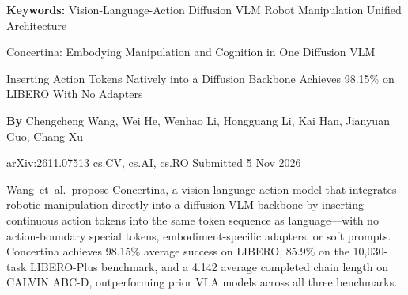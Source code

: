 \documentclass[10pt,twocolumn]{article}
\begin{document}
\setlength{\parindent}{0pt}
\setlength{\parskip}{4pt}

{\small\color{keywordgray}\textbf{Keywords:}
  Vision-Language-Action \textbullet{} Diffusion VLM \textbullet{} Robot Manipulation \textbullet{} Unified Architecture}\par\vspace{4pt}

{\LARGE\bfseries\raggedright Concertina: Embodying Manipulation and Cognition in One Diffusion VLM}\par\vspace{4pt}
{\large\itshape\raggedright Inserting Action Tokens Natively into a Diffusion Backbone Achieves 98.15\% on LIBERO With No Adapters}\par\vspace{6pt}
{\small\textbf{By} Chengcheng Wang, Wei He, Wenhao Li, Hongguang Li, Kai Han, Jianyuan Guo, Chang Xu}\par\vspace{2pt}
{\small\color{keywordgray}arXiv:2611.07513 \textbullet{} cs.CV, cs.AI, cs.RO \textbullet{} Submitted 5 Nov 2026}
\par\vspace{2pt}\noindent{\color{rulered}\rule{\columnwidth}{0.6pt}}\vspace{6pt}

Wang~et~al.\ propose Concertina, a vision-language-action model that integrates robotic manipulation directly into a diffusion VLM backbone by inserting continuous action tokens into the same token sequence as language---with no action-boundary special tokens, embodiment-specific adapters, or soft prompts.
Concertina achieves 98.15\% average success on LIBERO, 85.9\% on the 10,030-task LIBERO-Plus benchmark, and a 4.142 average completed chain length on CALVIN ABC-D, outperforming prior VLA models across all three benchmarks.
\end{document}
